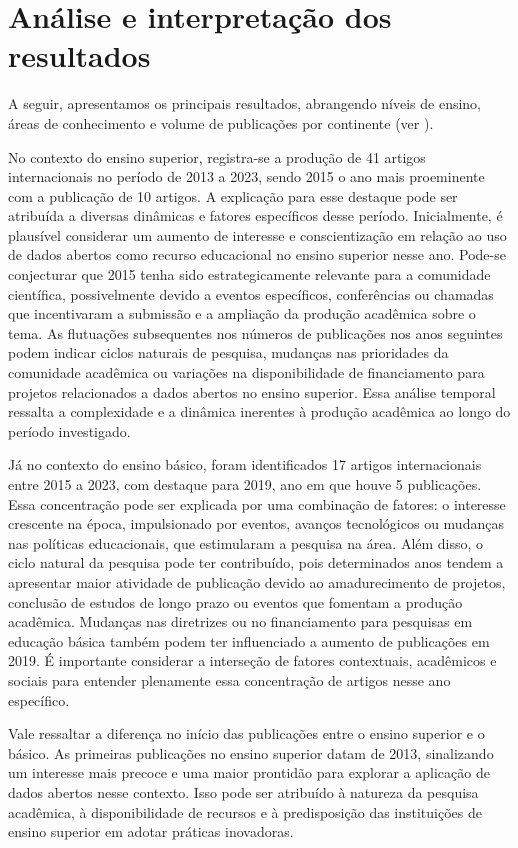 \documentclass[portuguese]{textolivre}
\begin{document}
\section{Análise e interpretação dos resultados}\label{sec-organizacao-latex}
A seguir, apresentamos os principais resultados, abrangendo níveis de ensino, áreas de conhecimento e volume de publicações por continente (ver ).

No contexto do ensino superior, registra-se a produção de 41 artigos internacionais no período de 2013 a 2023, sendo 2015 o ano mais proeminente com a publicação de 10 artigos. A explicação para esse destaque pode ser atribuída a diversas dinâmicas e fatores específicos desse período. Inicialmente, é plausível considerar um aumento de interesse e conscientização em relação ao uso de dados abertos como recurso educacional no ensino superior nesse ano. Pode-se conjecturar que 2015 tenha sido estrategicamente relevante para a comunidade científica, possivelmente devido a eventos específicos, conferências ou chamadas que incentivaram a submissão e a ampliação da produção acadêmica sobre o tema. As flutuações subsequentes nos números de publicações nos anos seguintes podem indicar ciclos naturais de pesquisa, mudanças nas prioridades da comunidade acadêmica ou variações na disponibilidade de financiamento para projetos relacionados a dados abertos no ensino superior. Essa análise temporal ressalta a complexidade e a dinâmica inerentes à produção acadêmica ao longo do período investigado.

Já no contexto do ensino básico, foram identificados 17 artigos internacionais entre 2015 a 2023, com destaque para 2019, ano em que houve 5 publicações. Essa concentração pode ser explicada por uma combinação de fatores: o interesse crescente na época, impulsionado por eventos, avanços tecnológicos ou mudanças nas políticas educacionais, que estimularam a pesquisa na área. Além disso, o ciclo natural da pesquisa pode ter contribuído, pois determinados anos tendem a apresentar maior atividade de publicação devido ao amadurecimento de projetos, conclusão de estudos de longo prazo ou eventos que fomentam a produção acadêmica. Mudanças nas diretrizes ou no financiamento para pesquisas em educação básica também podem ter influenciado a aumento de publicações em 2019. É importante considerar a interseção de fatores contextuais, acadêmicos e sociais para entender plenamente essa concentração de artigos nesse ano específico.

Vale ressaltar a diferença no início das publicações entre o ensino superior e o básico. As primeiras publicações no ensino superior datam de 2013, sinalizando um interesse mais precoce e uma maior prontidão para explorar a aplicação de dados abertos nesse contexto. Isso pode ser atribuído à natureza da pesquisa acadêmica, à disponibilidade de recursos e à predisposição das instituições de ensino superior em adotar práticas inovadoras.
\end{document}
